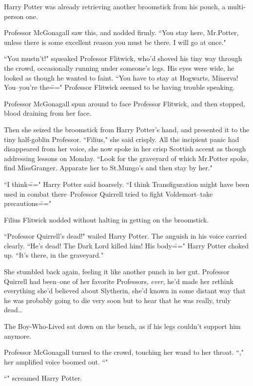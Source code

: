 Harry Potter was already retrieving another broomstick from his pouch, a multi-person one.

Professor McGonagall saw this, and nodded firmly. ``You stay here, Mr.\?Potter, unless there is some excellent reason you must be there. I will go at once."

``You mustn't!" squeaked Professor Flitwick, who'd shoved his tiny way through the crowd, occasionally running under someone's legs. His eyes were wide, he looked as though he wanted to faint. ``You have to stay at Hogwarts, Minerva! You\---you're the\===" Professor Flitwick seemed to be having trouble speaking.

Professor McGonagall spun around to face Professor Flitwick, and then stopped, blood draining from her face.

Then she seized the broomstick from Harry Potter's hand, and presented it to the tiny half-goblin Professor. ``Filius," she said crisply. All the incipient panic had disappeared from her voice, she now spoke in her crisp Scottish accent as though addressing lessons on Monday. ``Look for the graveyard of which Mr.\?Potter spoke, find Miss\?Granger. Apparate her to St.\?Mungo's and then stay by her."

``I think\===" Harry Potter said hoarsely. ``I think Transfiguration might have been used in combat there\---Professor Quirrell tried to fight Voldemort\---take precautions\==="

Filius Flitwick nodded without halting in getting on the broomstick.

``Professor Quirrell's dead!" wailed Harry Potter. The anguish in his voice carried clearly. ``He's dead! The Dark Lord killed him! His body\===" Harry Potter choked up. ``It's there, in the graveyard."

She stumbled back again, feeling it like another punch in her gut. Professor Quirrell had been\---one of her favorite Professors, \emph{ever}, he'd made her rethink everything she'd believed about Slytherin, she'd known in some distant way that he was probably going to die very soon but to hear that he was really, truly dead{\ldots}

The Boy-Who-Lived sat down on the bench, as if his legs couldn't support him anymore.

Professor McGonagall turned to the crowd, touching her wand to her throat. ``," her amplified voice boomed out. ``"

``" screamed Harry Potter.

